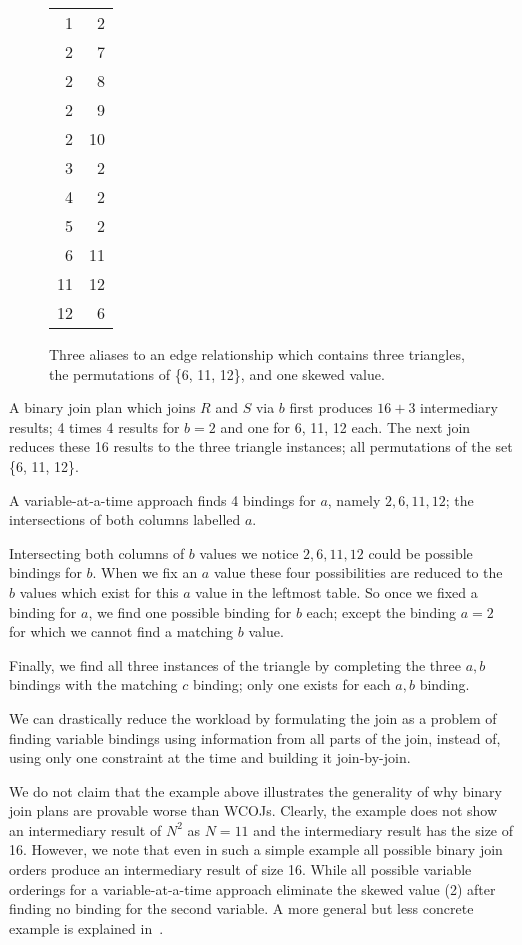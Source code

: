 \begin{figure}
{\begin{tabular}{rr}
        1 &  2 \\
        2 &  7 \\
        2 &  8 \\
        2 &  9 \\
        2 & 10 \\
        3 &  2 \\
        4 &  2 \\
        5 &  2 \\
        6 & 11 \\
        11 & 12 \\
        12 &  6 \\\bottomrule
    \end{tabular}
    }
    \caption{
    Three aliases to an edge relationship which contains three triangles, the permutations of \{6, 11, 12\},
    and one skewed value.
    }
    \label{fig:edge-rel-example}
\end{figure}

A binary join plan which joins $R$ and $S$ via $b$ first produces $16 + 3$ intermediary results;
4 times 4 results for $b = 2$ and one for 6, 11, 12 each.
The next join reduces these 16 results to the three triangle instances; all permutations of the set \{6, 11, 12\}.

A variable-at-a-time approach finds 4 bindings for $a$, namely  $2, 6, 11, 12$;
the intersections of both columns labelled $a$.

Intersecting both columns of $b$ values we notice $2, 6, 11, 12$ could be possible bindings for $b$.
When we fix an $a$ value these four possibilities are reduced to the $b$ values which exist for this
$a$ value in the leftmost table.
So once we fixed a binding for $a$, we find one possible binding for $b$ each;
except the binding $a = 2$ for which we cannot find a matching $b$ value.

Finally, we find all three instances of the triangle by completing the three $a, b$ bindings with
the matching $c$ binding;
only one exists for each $a, b$ binding.

We can drastically reduce the workload by formulating the join as a problem of
finding variable bindings using information from all parts of the join, instead of, using only one constraint at the time
and building it join-by-join.

We do not claim that the example above illustrates the generality of why binary join plans are provable worse than
\textsc{WCOJ}s.
Clearly, the example does not show an intermediary result of $N^2$ as $N = 11$ and the intermediary result has the size of 16.
However, we note that even in such a simple example all possible binary join orders produce an intermediary result of size 16.
While all possible variable orderings for a variable-at-a-time approach eliminate the skewed value (2) after finding no binding
for the second variable.
A more general but less concrete example is explained in~\cite{skew-strikes-back}.


